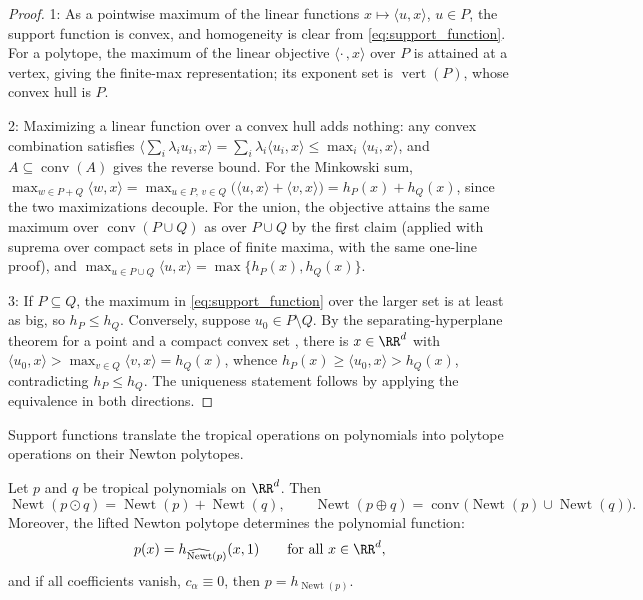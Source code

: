 \begin{proof}
1: As a pointwise maximum of the linear functions $x \mapsto \langle u, x\rangle$, $u \in P$, the support function is convex, and homogeneity is clear from \eqref{eq:support_function}. For a polytope, the maximum of the linear objective $\langle \cdot\,, x \rangle$ over $P$ is attained at a vertex, giving the finite-max representation; its exponent set is $\operatorname{vert}(P)$, whose convex hull is $P$.

2: Maximizing a linear function over a convex hull adds nothing: any convex combination satisfies $\bigl\langle \sum_i \lambda_i u_i, x \bigr\rangle = \sum_i \lambda_i \langle u_i, x\rangle \le \max_i \langle u_i, x \rangle$, and $A \subseteq \operatorname{conv}(A)$ gives the reverse bound. For the Minkowski sum, $\max_{w \in P + Q} \langle w, x \rangle = \max_{u \in P,\, v \in Q} \bigl( \langle u, x\rangle + \langle v, x\rangle \bigr) = h_P(x) + h_Q(x)$, since the two maximizations decouple. For the union, the objective attains the same maximum over $\operatorname{conv}(P \cup Q)$ as over $P \cup Q$ by the first claim (applied with suprema over compact sets in place of finite maxima, with the same one-line proof), and $\max_{u \in P \cup Q} \langle u, x \rangle = \max\{h_P(x), h_Q(x)\}$.

3: If $P \subseteq Q$, the maximum in \eqref{eq:support_function} over the larger set is at least as big, so $h_P \le h_Q$. Conversely, suppose $u_0 \in P \setminus Q$. By the separating-hyperplane theorem for a point and a compact convex set \parencite{BoydVandenberghe2004}, there is $x \in \RR^d$ with $\langle u_0, x \rangle > \max_{v \in Q} \langle v, x \rangle = h_Q(x)$, whence $h_P(x) \ge \langle u_0, x\rangle > h_Q(x)$, contradicting $h_P \le h_Q$. The uniqueness statement follows by applying the equivalence in both directions.
\end{proof}

Support functions translate the tropical operations on polynomials into polytope operations on their Newton polytopes.

\begin{proposition}\label{prop:newton_calculus}
Let $p$ and $q$ be tropical polynomials on $\RR^d$. Then
\begin{equation}
	\operatorname{Newt}(p \odot q) = \operatorname{Newt}(p) + \operatorname{Newt}(q),
	\qquad
	\operatorname{Newt}(p \oplus q) = \operatorname{conv}\bigl( \operatorname{Newt}(p) \cup \operatorname{Newt}(q) \bigr).
	\label{eq:newton_calculus}
\end{equation}
Moreover, the lifted Newton polytope determines the polynomial function:
\begin{equation}
	p(x) = h_{\widehat{\operatorname{Newt}}(p)}(x, 1)
	\qquad \text{for all } x \in \RR^{d},
	\label{eq:lifted_support}
\end{equation}
and if all coefficients vanish, $c_{\alpha} \equiv 0$, then $p = h_{\operatorname{Newt}(p)}$.
\hfill{}
\end{proposition}

